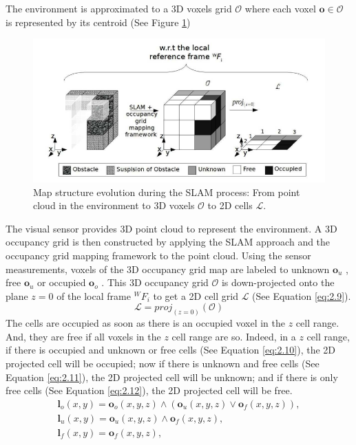The environment is approximated to a 3D voxels grid $\mathcal{O}$ where each voxel $\mathbf{o} \in \mathcal{O}$ is represented by its centroid (See Figure \ref{fig:2.19})
\begin{figure}[H]
    \centering
    \includegraphics[scale=0.4]{assets/2_19.png}
    \caption{Map structure evolution during the SLAM process: From point cloud in the environment to 3D voxels $\mathcal{O}$ to 2D cells $\mathcal{L}$.}
    \label{fig:2.19}
\end{figure}
The visual sensor provides 3D point cloud to represent the environment. A 3D occupancy grid is then constructed by applying the SLAM approach and the occupancy grid mapping framework to the point cloud. Using the sensor measurements, voxels of the 3D occupancy grid map are labeled to unknown $\mathbf{o}_u$ , free $\mathbf{o}_u$ or occupied $\mathbf{o}_o$ . This 3D occupancy grid $\mathcal{O}$ is down-projected onto the plane $z = 0$ of the local frame $^WF_i$ to get a 2D cell grid $\mathcal{L}$ (See Equation \ref{eq:2.9}).
\begin{equation}\label{eq:2.9}
    \mathcal{L}=proj_{(z=0)}(\mathcal{O})
\end{equation}
The cells are occupied as soon as there is an occupied voxel in the $z$ cell range. And, they are free if all voxels in the $z$ cell range are so. Indeed, in a $z$ cell range, if there is occupied and unknown or free cells (See Equation \ref{eq:2.10}), the 2D projected cell will be occupied; now if there is unknown and free cells (See Equation \ref{eq:2.11}), the 2D projected cell will be unknown; and if there is only free cells (See Equation \ref{eq:2.12}), the 2D projected cell will be free.
\begin{eqnarray}
    \mathbf{l}_o(x,y)=\mathbf{o}_o(x,y,z)\wedge (\mathbf{o}_u(x,y,z)\vee \mathbf{o}_f(x,y,z)),\label{eq:2.10}\\
    \mathbf{l}_u(x,y)=\mathbf{o}_u(x,y,z)\wedge\mathbf{o}_f(x,y,z),\label{eq:2.11}\\
    \mathbf{l}_f(x,y)=\mathbf{o}_f(x,y,z),\label{eq:2.12}
\end{eqnarray}
